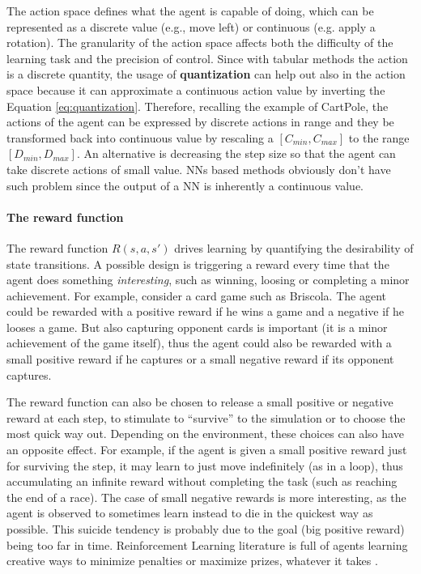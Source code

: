 The action space defines what the agent is capable of doing, which can be represented as a discrete value (e.g., move left) or continuous (e.g. apply a rotation).
The granularity of the action space affects both the difficulty of the learning task and the precision of control.
Since with tabular methods the action is a discrete quantity, the usage of \textbf{quantization} can help out also in the action space because it can approximate a continuous action value by inverting the Equation \ref{eq:quantization}. Therefore, recalling the example of CartPole, the actions of the agent can be expressed by discrete actions in range and they be transformed back into continuous value by rescaling a $[C_{min}, C_{max}]$ to the range $[D_{min}, D_{max}]$. An alternative is decreasing the step size so that the agent can take discrete actions of small value.
NNs based methods obviously don't have such problem since the output of a NN is inherently a continuous value.

\paragraph{The reward function}

The reward function $R(s, a, s')$ drives learning by quantifying the desirability of state transitions.
A possible design is triggering a reward every time that the agent does something \textit{interesting}, such as winning, loosing or completing a minor achievement.
For example, consider a card game such as Briscola. The agent could be rewarded with a positive reward if he wins a game and a negative if he looses a game.
But also capturing opponent cards is important (it is a minor achievement of the game itself), thus the agent could also be rewarded with a small positive reward if he captures or a small negative reward if its opponent captures.

The reward function can also be chosen to release a small positive or negative reward at each step, to stimulate to ``survive'' to the simulation or to choose the most quick way out. Depending on the environment, these choices can also have an opposite effect. For example, if the agent is given a small positive reward just for surviving the step, it may learn to just move indefinitely (as in a loop), thus accumulating an infinite reward without completing the task (such as reaching the end of a race). The case of small negative rewards is more interesting, as the agent is observed to sometimes learn instead to die in the quickest way as possible. This suicide tendency is probably due to the goal (big positive reward) being too far in time. Reinforcement Learning literature is full of agents learning creative ways to minimize penalties or maximize prizes, whatever it takes \cite{10.1162/artl_a_00319}.


